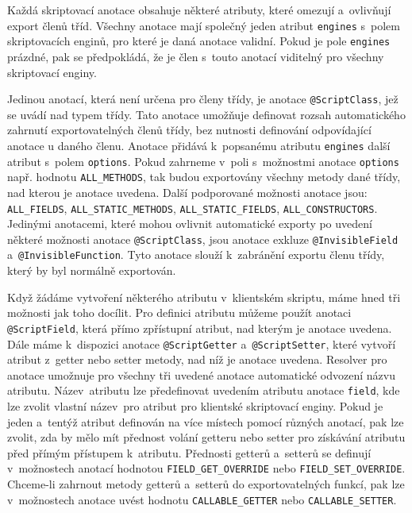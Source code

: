 \vspace{-1em}

Každá skriptovací anotace obsahuje některé atributy, které omezují a~ovlivňují export členů tříd. Všechny anotace mají společný jeden atribut \texttt{engines} s~polem skriptovacích enginů, pro které je daná anotace validní. Pokud je pole \texttt{engines} prázdné, pak se předpokládá, že je člen s~touto anotací viditelný pro všechny skriptovací enginy. 

Jedinou anotací, která není určena pro členy třídy, je anotace \texttt{@ScriptClass}, jež se uvádí nad typem třídy. Tato anotace umožňuje definovat rozsah automatického zahrnutí exportovatelných členů třídy, bez nutnosti definování odpovídající anotace u daného členu. Anotace přidává k~popsanému atributu \texttt{engines} další atribut s~polem \texttt{options}. Pokud zahrneme v~poli s~možnostmi anotace \texttt{options} např. hodnotu \texttt{ALL\_METHODS}, tak budou exportovány všechny metody dané třídy, nad kterou je anotace uvedena. Další podporované možnosti anotace jsou: \texttt{ALL\_FIELDS}, \texttt{ALL\_STATIC\_METHODS}, \texttt{ALL\_STATIC\_FIELDS}, \texttt{ALL\_CONSTRUCTORS}. Jedinými anotacemi, které mohou ovlivnit automatické exporty po uvedení některé možnosti anotace \texttt{@ScriptClass}, jsou anotace exkluze \texttt{@InvisibleField} a~\texttt{@InvisibleFunction}. Tyto anotace slouží k~zabránění exportu členu třídy, který by byl normálně exportován. 

Když žádáme vytvoření některého atributu v~klientském skriptu, máme hned tři možnosti jak toho docílit. Pro definici atributu můžeme použít anotaci \texttt{@ScriptField}, která přímo zpřístupní atribut, nad kterým je anotace uvedena. Dále máme k~dispozici anotace \texttt{@ScriptGetter} a~\texttt{@ScriptSetter}, které vytvoří atribut z~getter nebo setter metody, nad níž je anotace uvedena. Resolver pro anotace umožnuje pro všechny tři uvedené anotace automatické odvození názvu atributu. Název~atributu lze předefinovat uvedením atributu anotace \texttt{field}, kde lze zvolit vlastní název~pro atribut pro klientské skriptovací enginy. Pokud je jeden a~tentýž atribut definován na více místech pomocí různých anotací, pak lze zvolit, zda by mělo mít přednost volání getteru nebo setter pro získávání atributu před přímým přístupem k~atributu. Přednosti getterů a~setterů se definují v~možnostech anotací hodnotou \texttt{FIELD\_GET\_OVERRIDE} nebo \texttt{FIELD\_SET\_OVERRIDE}. Chceme-li zahrnout metody getterů a~setterů do exportovatelných funkcí, pak lze v~možnostech anotace uvést hodnotu \texttt{CALLABLE\_GETTER} nebo \texttt{CALLABLE\_SETTER}.

